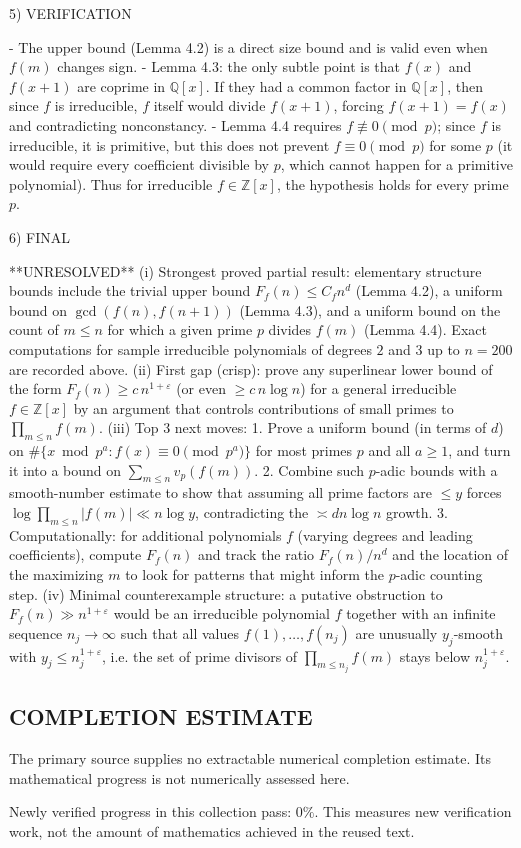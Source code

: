 5) VERIFICATION

- The upper bound (Lemma 4.2) is a direct size bound and is valid even when $f(m)$ changes sign.
- Lemma 4.3: the only subtle point is that $f(x)$ and $f(x+1)$ are coprime in $\mathbb Q[x]$.
  If they had a common factor in $\mathbb Q[x]$, then since $f$ is irreducible, $f$ itself would divide $f(x+1)$,
  forcing $f(x+1)=f(x)$ and contradicting nonconstancy.
- Lemma 4.4 requires $f\not\equiv 0\pmod p$; since $f$ is irreducible, it is primitive, but this does not prevent
  $f\equiv 0\pmod p$ for some $p$ (it would require every coefficient divisible by $p$, which cannot happen for a primitive polynomial). Thus for irreducible $f\in\mathbb Z[x]$, the hypothesis holds for every prime $p$.

6) FINAL

**UNRESOLVED**
(i) Strongest proved partial result: elementary structure bounds include the trivial upper bound $F_f(n)\le C_f n^d$ (Lemma 4.2), a uniform bound on $\gcd(f(n),f(n+1))$ (Lemma 4.3), and a uniform bound on the count of $m\le n$ for which a given prime $p$ divides $f(m)$ (Lemma 4.4). Exact computations for sample irreducible polynomials of degrees $2$ and $3$ up to $n=200$ are recorded above.
(ii) First gap (crisp): prove any superlinear lower bound of the form $F_f(n)\ge c\,n^{1+\varepsilon}$ (or even $\ge c\,n\log n$) for a general irreducible $f\in\mathbb Z[x]$ by an argument that controls contributions of small primes to $\prod_{m\le n} f(m)$.
(iii) Top 3 next moves:
  1. Prove a uniform bound (in terms of $d$) on $\#\{x\bmod p^a: f(x)\equiv 0\pmod{p^a}\}$ for most primes $p$ and all $a\ge 1$, and turn it into a bound on $\sum_{m\le n} v_p(f(m))$.
  2. Combine such $p$-adic bounds with a smooth-number estimate to show that assuming all prime factors are $\le y$ forces $\log\prod_{m\le n}|f(m)|\ll n\log y$, contradicting the $\asymp d n\log n$ growth.
  3. Computationally: for additional polynomials $f$ (varying degrees and leading coefficients), compute $F_f(n)$ and track the ratio $F_f(n)/n^d$ and the location of the maximizing $m$ to look for patterns that might inform the $p$-adic counting step.
(iv) Minimal counterexample structure: a putative obstruction to $F_f(n)\gg n^{1+\varepsilon}$ would be an irreducible polynomial $f$ together with an infinite sequence $n_j\to\infty$ such that all values $f(1),\dots,f(n_j)$ are unusually $y_j$-smooth with $y_j\le n_j^{1+\varepsilon}$, i.e. the set of prime divisors of $\prod_{m\le n_j} f(m)$ stays below $n_j^{1+\varepsilon}$.




\subsection*{COMPLETION ESTIMATE}
The primary source supplies no extractable numerical completion estimate. Its mathematical progress is not numerically assessed here.

Newly verified progress in this collection pass: $0\%$. This measures new verification work, not the amount of mathematics achieved in the reused text.
